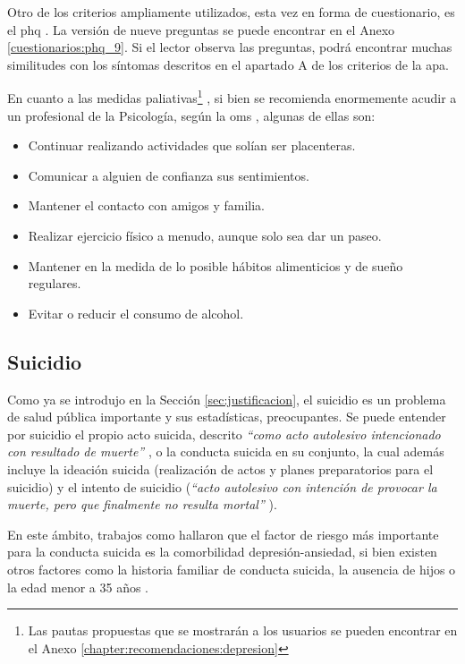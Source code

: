         Otro de los criterios ampliamente utilizados, esta vez en forma de cuestionario, es el \gls{phq} \cite{kroenke_phq-9_2001}. La versión de nueve preguntas se puede encontrar en el Anexo \ref{cuestionarios:phq_9}. Si el lector observa las preguntas, podrá encontrar muchas similitudes con los síntomas descritos en el apartado A de los criterios de la \gls{apa}.

        En cuanto a las medidas paliativas\footnote{Las pautas propuestas que se mostrarán a los usuarios se pueden encontrar en el Anexo \ref{chapter:recomendaciones:depresion}} , si bien se recomienda enormemente acudir a un profesional de la Psicología, según la \gls{oms} \cite{oms_depresion_2023}, algunas de ellas son: 

        \begin{itemize}
            \item Continuar realizando actividades que solían ser placenteras.
            \item Comunicar a alguien de confianza sus sentimientos.
            \item Mantener el contacto con amigos y familia.
            \item Realizar ejercicio físico a menudo, aunque solo sea dar un paseo.
            \item Mantener en la medida de lo posible hábitos alimenticios y de sueño regulares.
            \item Evitar o reducir el consumo de alcohol.
        \end{itemize}

    \subsection{Suicidio}

        Como ya se introdujo en la Sección \ref{sec:justificacion}, el suicidio es un problema de salud pública importante y sus estadísticas, preocupantes. Se puede entender por suicidio el propio acto suicida, descrito \textit{``como acto autolesivo intencionado con resultado de muerte''} \cite{moutier_conducta_2023}, o la conducta suicida en su conjunto, la cual además incluye la ideación suicida (realización de actos y planes preparatorios para el suicidio) y el intento de suicidio (\textit{``acto autolesivo con intención de provocar la muerte, pero que finalmente no resulta mortal''} \cite{moutier_conducta_2023}).

        En este ámbito, trabajos como \cite{baca_garcia_factores_2014} hallaron que el factor de riesgo más importante para la conducta suicida es la \gls{comorbilidad} depresión-ansiedad, si bien existen otros factores como la historia familiar de conducta suicida, la ausencia de hijos o la edad menor a 35 años \cite{baca_garcia_factores_2014}.
        
